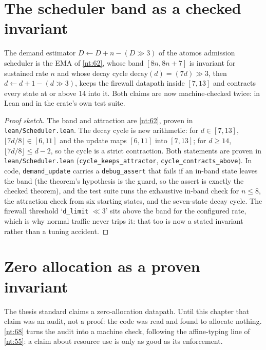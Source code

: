 \section{The scheduler band as a checked invariant}\label{sec:sched-band}

\begin{theorem}\label{nt:67}
The demand estimator $D \leftarrow D + n - (D \gg 3)$ of the atomos
admission scheduler is the EMA of \autoref{nt:62}, whose band
$[8n, 8n+7]$ is invariant for sustained rate $n$ and whose decay cycle
$\mathrm{decay}(d) = (7d) \gg 3$, then $d \leftarrow d + 1 - (d \gg 3)$,
keeps the firewall datapath inside $[7, 13]$ and contracts every state
at or above 14 into it. Both claims are now machine-checked twice: in
Lean and in the crate's own test suite.
\end{theorem}

\begin{proof}[Proof sketch]
The band and attraction are \autoref{nt:62}, proven in
\texttt{lean/Scheduler.lean}. The decay cycle is new arithmetic: for
$d \in [7,13]$, $\lfloor 7d/8 \rfloor \in [6,11]$ and the update maps
$[6,11]$ into $[7,13]$; for $d \ge 14$,
$\lfloor 7d/8 \rfloor \le d - 2$, so the cycle is a strict contraction.
Both statements are proven in \texttt{lean/Scheduler.lean}
(\texttt{cycle\_keeps\_attractor}, \texttt{cycle\_contracts\_above}).
In code, \texttt{demand\_update} carries a \texttt{debug\_assert} that
fails if an in-band state leaves the band (the theorem's hypothesis is
the guard, so the assert is exactly the checked theorem), and the test
suite runs the exhaustive in-band check for $n \le 8$, the attraction
check from six starting states, and the seven-state decay cycle. The
firewall threshold `\texttt{d\_limit} $\ll 3$' sits above the band for
the configured rate, which is why normal traffic never trips it: that
too is now a stated invariant rather than a tuning accident.
\end{proof}

\section{Zero allocation as a proven invariant}\label{sec:zero-alloc}

The thesis standard claims a zero-allocation datapath. Until this
chapter that claim was an audit, not a proof: the code was read and
found to allocate nothing. \autoref{nt:68} turns the audit into a
machine check, following the affine-typing line of \autoref{nt:55}: a
claim about resource use is only as good as its enforcement.

